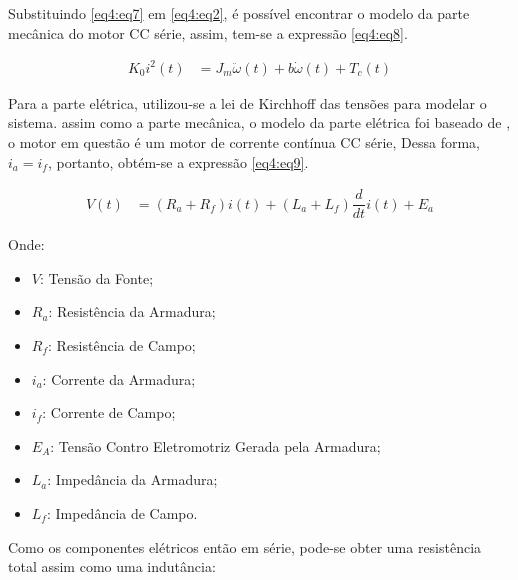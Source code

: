 Substituindo \ref{eq4:eq7} em \ref{eq4:eq2}, é possível encontrar o modelo da parte mecânica do motor CC série, assim, tem-se a expressão  \ref{eq4:eq8}.


\begin{align}
	K_0 i^2(t) &= J_m\ddot{\omega}(t) + b\dot{\omega}(t) + T_c(t) \label{eq4:eq8}
\end{align}




Para a parte elétrica, utilizou-se a lei de Kirchhoff das tensões para modelar o sistema. assim como a parte mecânica, o modelo da parte elétrica foi baseado de \cite{jesus}, o motor em questão é um motor de corrente contínua CC série, Dessa forma, $i_a = i_f$, portanto, obtém-se a expressão \ref{eq4:eq9}.


\begin{align}
	V(t) &= (R_a + R_f)i(t)+ (L_a + L_f)\dfrac{d}{dt}i(t) + E_a \label{eq4:eq9}
\end{align}

\noindent Onde:

\begin{itemize}
        \setlength{\itemsep}{-2pt}
	\item $V$: Tensão da Fonte;
	\item $R_a$: Resistência da Armadura;
	\item $R_f$: Resistência de Campo;
	\item $i_a$: Corrente da Armadura;
	\item $i_f$: Corrente de Campo;
	\item $E_A$: Tensão Contro Eletromotriz Gerada pela Armadura;
	\item $L_a$: Impedância da Armadura;
	\item $L_f$: Impedância de Campo.
\end{itemize}

Como os componentes elétricos então em série, pode-se obter uma resistência total assim como uma indutância:


